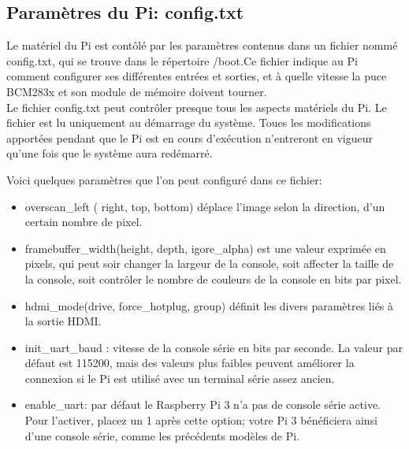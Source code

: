 \documentclass[12pt,a4paper,oneside]{book}
\begin{document}
			\subsection{Paramètres du Pi: config.txt}
				
				Le matériel du Pi est contôlé par les paramètres contenus dans un fichier nommé config.txt, qui se trouve dans le répertoire /boot.Ce fichier indique au Pi comment configurer ses différentes entrées et sorties, et à quelle vitesse la puce BCM283x et son module de mémoire doivent tourner.\\
				
				Le fichier config.txt peut contrôler presque tous les aspects matériels du Pi. Le fichier est lu uniquement au démarrage du système. Toues les modifications apportées pendant que le Pi est en cours d'exécution n'entreront en vigueur qu'une fois que le système aura redémarré. 
				
				Voici quelques paramètres que l'on peut configuré dans ce fichier:
				\begin{itemize}
					\item overscan\_left ( right, top, bottom) déplace l'image selon la direction, d'un certain nombre de pixel.
						\item framebuffer\_width(height, depth, igore\_alpha) est une valeur exprimée en pixels, qui peut soir changer la largeur de la console, soit affecter la taille de la console, soit contrôler le nombre de couleurs de la console en bits par pixel.\\
					\item hdmi\_mode(drive, force\_hotplug, group) définit les divers paramètres liés à la sortie HDMI.\\
					\item init\_uart\_baud : vitesse de la console série en bits par seconde. La valeur par défaut est 115200, mais des valeurs plus faibles peuvent améliorer la connexion si le Pi est utilisé avec un terminal série assez ancien.\\
					\item enable\_uart: par défaut le Raspberry Pi 3 n'a pas de console série active. Pour l'activer, placez un 1 après cette option; votre Pi 3 bénéficiera ainsi d'une console série, comme les précédents modèles de Pi.
				\end{itemize}
			
\end{document}
